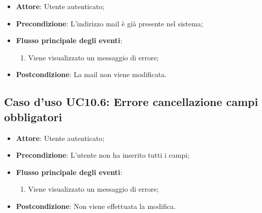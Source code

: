 \documentclass[12pt,a4paper]{article}
\begin{document}
\begin{itemize}

\item \textbf{Attore}: Utente autenticato; 
\item \textbf{Precondizione}: L'indirizzo mail è già presente nel sistema;

\item \textbf{Flusso principale degli eventi}:
\begin{enumerate}
	\item Viene visualizzato un messaggio di errore;
	
\end{enumerate}
\item \textbf{Postcondizione}: La mail non viene modificata.
\end{itemize}
\hypertarget{UC10.6}{}
\subsection{Caso d'uso UC10.6: Errore cancellazione campi obbligatori}

\begin{itemize}

\item \textbf{Attore}: Utente autenticato; 
\item \textbf{Precondizione}: L'utente non ha inserito tutti i campi;

\item \textbf{Flusso principale degli eventi}:
\begin{enumerate}
	\item Viene visualizzato un messaggio di errore;
	
\end{enumerate}
\item \textbf{Postcondizione}: Non viene effettuata la modifica.
\end{itemize}
\hypertarget{UC11}{}
\end{document}
